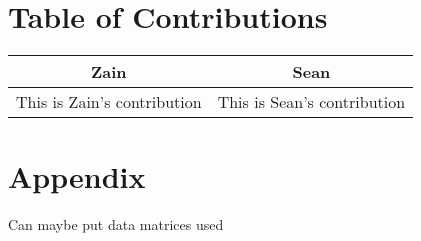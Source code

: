 \documentclass[conf]{new-aiaa}
\begin{document}
\section{Table of Contributions}


\begin{center}
\begin{tabular}{ |c|c| } 
\hline
\rowcolor{lightgray}
\textbf{Zain}& \textbf{Sean}\\
\hline
This is Zain's contribution & This is Sean's contribution\\ 
\hline
\end{tabular}
\end{center}


\section*{Appendix}

Can maybe put data matrices used


\end{document}
